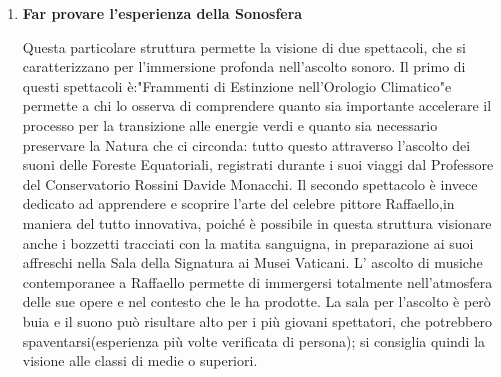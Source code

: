 \documentclass[hidelinks,12pt,a4paper]{article}
\begin{document}
\begin{flushleft}
\begin{enumerate}
\begin{adjustwidth}{-30mm}{0mm}
\begin{minipage}{\linewidth}
\begin{minipage}[t] {0.4\linewidth}
					\end{minipage}
				\end{minipage}
			\end{adjustwidth}
	
			\item \textbf{Far provare l'esperienza della Sonosfera}
			
			Questa particolare struttura permette la visione di due spettacoli, che si caratterizzano per l'immersione profonda nell'ascolto sonoro.
			Il primo di questi spettacoli è:"Frammenti di Estinzione nell'Orologio Climatico"e permette a chi lo osserva di comprendere quanto sia importante accelerare il processo per la transizione alle energie verdi e quanto sia necessario preservare la Natura che ci circonda: tutto questo attraverso l'ascolto dei suoni delle Foreste Equatoriali, registrati durante i suoi viaggi dal Professore del Conservatorio Rossini Davide Monacchi.
			Il secondo spettacolo è invece dedicato ad apprendere e scoprire l'arte del celebre pittore Raffaello,in maniera del tutto innovativa, poiché è possibile in questa struttura visionare anche i bozzetti tracciati con la matita sanguigna, in preparazione ai suoi affreschi nella Sala della Signatura ai Musei Vaticani.
			L' ascolto di musiche contemporanee a Raffaello permette di immergersi totalmente nell'atmosfera delle sue opere e nel contesto che le ha prodotte. La sala per l'ascolto è però buia e il suono può risultare alto per i più giovani spettatori, che potrebbero spaventarsi(esperienza più volte verificata di persona); si consiglia quindi la visione alle classi di medie o superiori.
			\end{enumerate}
			\newpage
			\listoffigures

			\vspace*{\fill}
			\doclicenseThis
	\end{flushleft}
\end{document}
